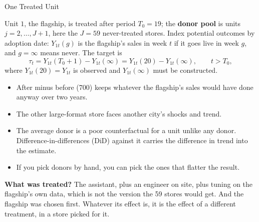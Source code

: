 \documentclass[aspectratio=169, 11pt, handout]{beamer}
\begin{document}
\begin{frame}{One Treated Unit}

Unit $1$, the flagship, is treated after period $T_0 = 19$; the \textbf{donor pool} is units $j = 2, \dots, J+1$, here the $J = 59$ never-treated stores. Index potential outcomes by adoption date: $Y_{1t}(g)$ is the flagship's sales in week $t$ if it goes live in week $g$, and $g = \infty$ means never. The target is
\[
\tau_t = Y_{1t}(T_0 + 1) - Y_{1t}(\infty) = Y_{1t}(20) - Y_{1t}(\infty), \qquad t > T_0,
\]
where $Y_{1t}(20) = Y_{1t}$ is observed and $Y_{1t}(\infty)$ must be constructed.

\medskip

\begin{itemize}
  \item After minus before (700) keeps whatever the flagship's sales would have done anyway over two years.
  \item The other large-format store faces another city's shocks and trend.
  \item The average donor is a poor counterfactual for a unit unlike any donor. Difference-in-differences (DiD) against it carries the difference in trend into the estimate.
  \item If you pick donors by hand, you can pick the ones that flatter the result.
\end{itemize}

\medskip

\textbf{What was treated?} The assistant, plus an engineer on site, plus tuning on the flagship's own data, which is not the version the 59 stores would get. And the flagship was chosen first. Whatever its effect is, it is the effect of a different treatment, in a store picked for it.
\end{frame}
\end{document}
